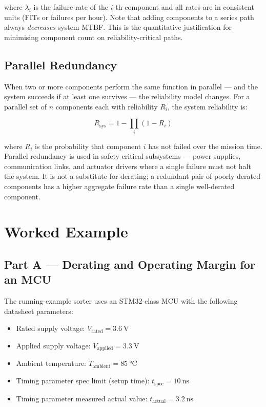 where $\lambda_i$ is the failure rate of the $i$-th component and all rates are in consistent units (FITs or failures per hour).
Note that adding components to a series path always \emph{decreases} system MTBF.
This is the quantitative justification for minimising component count on reliability-critical paths.

\subsection{Parallel Redundancy}
\label{sec:ch6-parallel}

When two or more components perform the same function in parallel --- and the system succeeds if at least one survives --- the reliability model changes.
For a parallel set of $n$ components each with reliability $R_i$, the system reliability is:

\begin{equation}\label{eq:ch6-parallel}
  R_{\text{sys}} = 1 - \prod_i (1 - R_i)
\end{equation}

where $R_i$ is the probability that component $i$ has not failed over the mission time.
Parallel redundancy is used in safety-critical subsystems --- power supplies, communication links, and actuator drivers where a single failure must not halt the system.
It is not a substitute for derating; a redundant pair of poorly derated components has a higher aggregate failure rate than a single well-derated component.

\section{Worked Example}
\label{sec:ch6-worked}

\subsection{Part A — Derating and Operating Margin for an MCU}
\label{sec:ch6-worked-a}

The running-example sorter uses an STM32-class MCU with the following datasheet parameters:
\begin{itemize}
  \item Rated supply voltage: $V_{\text{rated}} = 3.6~\mathrm{V}$
  \item Applied supply voltage: $V_{\text{applied}} = 3.3~\mathrm{V}$
  \item Ambient temperature: $T_{\text{ambient}} = 85~\mathrm{°C}$
  \item Timing parameter spec limit (setup time): $t_{\text{spec}} = 10~\mathrm{ns}$
  \item Timing parameter measured actual value: $t_{\text{actual}} = 3.2~\mathrm{ns}$
\end{itemize}

